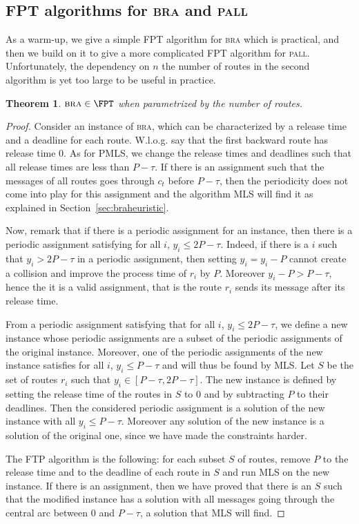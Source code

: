 \documentclass[10pt, conference, letterpaper]{IEEEtran}
\newtheorem{theorem}{Theorem}
\newcommand\pall{\textsc{pall}\xspace}
\newcommand\bra{\textsc{bra}\xspace}
\begin{document}
\subsection{FPT algorithms for \bra and \pall}

As a warm-up, we give a simple FPT algorithm for \bra which is practical,
and then we build on it to give a more complicated FPT algorithm for \pall. Unfortunately, the dependency on $n$ the number of routes in the second algorithm is yet too large to be useful in practice. 

\begin{theorem}\label{th:braFPT}
$\bra \in \FPT$ when parametrized by the number of routes.
\end{theorem}
\begin{proof}
 Consider an instance of \bra, which can be characterized by a release time and a deadline for each route. W.l.o.g. say that the first backward route has release time $0$. 
As for PMLS, we change the release times and deadlines such that all release times are less than $P - \tau$. If there is an assignment such that the messages of all routes goes through $c_t$ before $P-\tau$, then the periodicity does not come into play for this assignment and the algorithm MLS will find it as explained in Section~\ref{sec:braheuristic}.

 Now, remark that if there is a periodic assignment for an instance, then there is a periodic assignment satisfying for all $i$, $y_i \leq 2P - \tau$. Indeed, if there is a $i$ such that $y_i > 2P - \tau$ in
a periodic assignment, then setting $y_i = y_i - P$ cannot create a collision and improve the 
process time of $r_i$ by $P$. Moreover $y_i - P > P- \tau$, hence the it is a valid assignment, that is the route $r_i$ sends its message after its release time. 

From a periodic assignment satisfying that for all $i$, $y_i \leq 2P - \tau$, we define 
a new instance whose periodic assignments are a subset of the periodic assignments of the original instance. Moreover, one of the periodic assignments of the new instance satisfies for all $i$, $y_i \leq P - \tau$ and will thus be found by MLS.
Let $S$ be the set of routes $r_i$ such that  $y_i \in[P-\tau, 2P - \tau]$. The new instance is defined by setting the release time of the routes in $S$ to $0$ and by subtracting $P$ to their deadlines. Then the considered periodic assignment is a solution of the new instance with all $y_i \leq P -\tau$. Moreover any solution of the new instance is a solution of the original one, since we have made the constraints harder.   

The FTP algorithm is the following: for each subset $S$ of routes, remove $P$ to the release time and to the deadline of each route in $S$ and run MLS on the new instance. If there is an assignment, then we have proved that there is an $S$ such that the modified instance has a solution with all messages going through the central arc between $0$ and $P - \tau$, a solution that MLS will find.
\end{proof}
\end{document}
